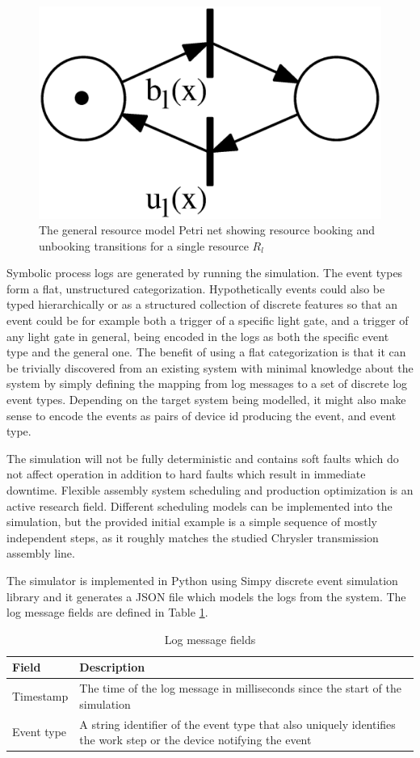 \documentclass[journal]{IEEEtran}
\begin{document}
\begin{figure}[tb]
 \centering
 \includegraphics[width=8 cm,keepaspectratio=true]{./general_resource_model.eps}
 \caption{The general resource model Petri net showing resource booking and unbooking transitions for a single resource $ R_l $}
 \label{figure:resource_model}
\end{figure}

Symbolic process logs are generated by running the simulation. The event types form a flat, unstructured categorization. Hypothetically events could also be typed hierarchically or as a structured collection
of discrete features so that an event could be for example both
a trigger of a specific light gate, and a trigger of any light gate in general, being encoded in the logs as both the specific event type and the general one. The benefit of using a flat categorization is that
it can be trivially discovered from an existing system with minimal knowledge about the system by simply defining the mapping from log messages to a set of discrete log event types.
Depending on the target system being modelled, it might also make sense to encode the events as pairs of device id producing the event, and event type.

The simulation will not be fully deterministic and contains soft faults which do not affect operation in addition to hard faults which result in immediate downtime.
Flexible assembly system scheduling and production optimization is an active research field. Different scheduling models can be implemented into the simulation,
but the provided initial example is a simple sequence of mostly independent steps, as it roughly matches the studied Chrysler transmission assembly line.

The simulator is implemented in Python using Simpy discrete event simulation library and it generates a JSON file which models the logs from the system.
The log message fields are defined in Table \ref{fields}.

\begin{table}[!t]
\renewcommand{\arraystretch}{1.3}
\caption{Log message fields}
\label{fields}
\centering
\begin{tabular}{|p{25mm}|p{45mm}|}
\hline
Field & Description \\
\hline
\hline
Timestamp & The time of the log message in milliseconds since the start of the simulation \\
\hline
Event type & A string identifier of the event type that also uniquely identifies the work step or the device notifying the event \\
\hline
\end{tabular}
\end{table}
\end{document}
